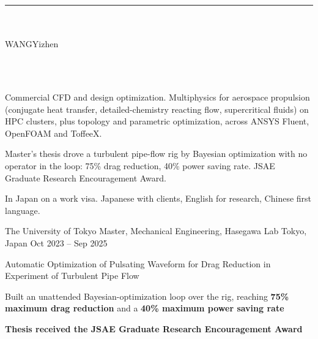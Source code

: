 \documentclass[9pt,a4paper]{extarticle}
\begin{document}
\thispagestyle{empty}

\begin{minipage}[b]{\linewidth}
  \textcolor{AccentDeep}{\rule{\linewidth}{1.2pt}}\\[4pt]
  \\[4pt]
  {\normalsize WANG\;Yizhen}

  \vspace{6pt}
  \\[4pt]
  {\footnotesize
    \hspace{1em}
    \hspace{1em}
    \\[2pt]
    \hspace{1em}
    \hspace{1em}
  }
\end{minipage}

\vspace{4pt}
\begin{cvitems}
  \item Commercial CFD and design optimization. Multiphysics for aerospace propulsion (conjugate heat transfer, detailed-chemistry reacting flow, supercritical fluids) on HPC clusters, plus topology and parametric optimization, across ANSYS Fluent, OpenFOAM and ToffeeX.
  \item Master's thesis drove a turbulent pipe-flow rig by Bayesian optimization with no operator in the loop: 75\% drag reduction, 40\% power saving rate. JSAE Graduate Research Encouragement Award.
  \item In Japan on a work visa. Japanese with clients, English for research, Chinese first language.
\end{cvitems}


\eduentry
  {The University of Tokyo}
  {Master, Mechanical Engineering, Hasegawa Lab}
  {Tokyo, Japan}
  {Oct 2023 -- Sep 2025}
  {\item Automatic Optimization of Pulsating Waveform for Drag Reduction in Experiment of Turbulent Pipe Flow
   \item Built an unattended Bayesian-optimization loop over the rig, reaching \textbf{75\% maximum drag reduction} and a \textbf{40\% maximum power saving rate}
   \item[] \textbf{Thesis received the JSAE Graduate Research Encouragement Award}}
\end{document}
